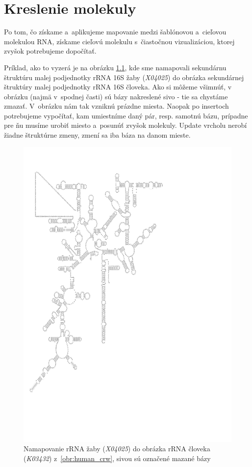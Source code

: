 \newcommand{\degree}{\ensuremath{^{\circ}}}

\chapter{Kreslenie molekuly}

Po tom, čo získame a~aplikujeme mapovanie medzi šablónovou a~cieľovou molekulou RNA,
získame cieľovú molekulu s~čiastočnou vizualizáciou, ktorej zvyšok potrebujeme dopočítať.

Príklad, ako to vyzerá je na obrázku \ref{obr:frog_to_human}, kde sme
namapovali sekundárnu štruktúru malej podjednotky rRNA 16S žaby (\textit{X04025}) do
obrázka sekundárnej štruktúry malej podjednotky rRNA 16S človeka.
Ako si môžeme všimnúť, v obrázku (najmä v~spodnej časti) sú bázy nakreslené
sivo - tie sa chystáme zmazať. V~obrázku nám tak vzniknú prázdne miesta.
Naopak po insertoch potrebujeme vypočítať, kam umiestníme daný pár,
resp. samotnú bázu, prípadne pre ňu musíme urobiť miesto a~posunúť zvyšok
molekuly. Update vrcholu nerobí žiadne štruktúrne zmeny, zmení sa iba
báza na danom mieste.

\begin{figure}
  \centering
  \includegraphics[clip, trim=0 5cm 6cm 2cm, width=1\textwidth]{../img/african_frog-to-human-mapped}
  \caption{Namapovanie rRNA žaby (\textit{X04025}) do obrázka rRNA človeka (\textit{K03432}) z~\ref{obr:human_crw}, sivou sú označené mazané bázy}
  \label{obr:frog_to_human}
\end{figure}

